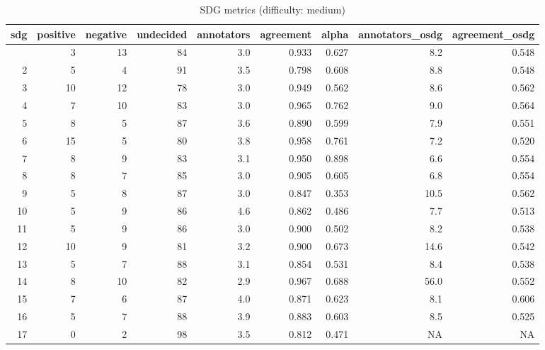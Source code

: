 \begin{table}[t]
\caption*{
{\large SDG metrics (difficulty: medium)}
} 
\fontsize{12.0pt}{14.4pt}\selectfont
\begin{tabular*}{\linewidth}{@{\extracolsep{\fill}}rrrrrrrrr}
\toprule
sdg & positive & negative & undecided & annotators & agreement & alpha & annotators\_osdg & agreement\_osdg \\ 
\midrule\addlinespace[2.5pt]
1 & 3 & 13 & 84 & 3.0 & 0.933 & 0.627 & 8.2 & 0.548 \\ 
2 & 5 & 4 & 91 & 3.5 & 0.798 & 0.608 & 8.8 & 0.548 \\ 
3 & 10 & 12 & 78 & 3.0 & 0.949 & 0.562 & 8.6 & 0.562 \\ 
4 & 7 & 10 & 83 & 3.0 & 0.965 & 0.762 & 9.0 & 0.564 \\ 
5 & 8 & 5 & 87 & 3.6 & 0.890 & 0.599 & 7.9 & 0.551 \\ 
6 & 15 & 5 & 80 & 3.8 & 0.958 & 0.761 & 7.2 & 0.520 \\ 
7 & 8 & 9 & 83 & 3.1 & 0.950 & 0.898 & 6.6 & 0.554 \\ 
8 & 8 & 7 & 85 & 3.0 & 0.905 & 0.605 & 6.8 & 0.554 \\ 
9 & 5 & 8 & 87 & 3.0 & 0.847 & 0.353 & 10.5 & 0.562 \\ 
10 & 5 & 9 & 86 & 4.6 & 0.862 & 0.486 & 7.7 & 0.513 \\ 
11 & 5 & 9 & 86 & 3.0 & 0.900 & 0.502 & 8.2 & 0.538 \\ 
12 & 10 & 9 & 81 & 3.2 & 0.900 & 0.673 & 14.6 & 0.542 \\ 
13 & 5 & 7 & 88 & 3.1 & 0.854 & 0.531 & 8.4 & 0.538 \\ 
14 & 8 & 10 & 82 & 2.9 & 0.967 & 0.688 & 56.0 & 0.552 \\ 
15 & 7 & 6 & 87 & 4.0 & 0.871 & 0.623 & 8.1 & 0.606 \\ 
16 & 5 & 7 & 88 & 3.9 & 0.883 & 0.603 & 8.5 & 0.525 \\ 
17 & 0 & 2 & 98 & 3.5 & 0.812 & 0.471 & NA & NA \\ 
\bottomrule
\end{tabular*}
\end{table}


